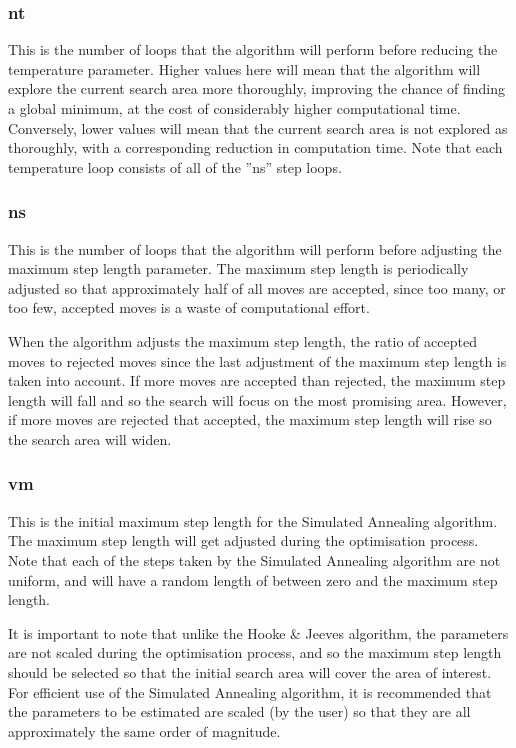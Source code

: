 \documentclass[10pt,twoside]{book}
\begin{document}
\subsubsection{nt}
This is the number of loops that the algorithm will perform before reducing the temperature parameter.  Higher values here will mean that the algorithm will explore the current search area more thoroughly, improving the chance of finding a global minimum, at the cost of considerably higher computational time.  Conversely, lower values will mean that the current search area is not explored as thoroughly, with a corresponding reduction in computation time.  Note that each temperature loop consists of all of the ''ns'' step loops.

\subsubsection{ns}
This is the number of loops that the algorithm will perform before adjusting the maximum step length parameter.  The maximum step length is periodically adjusted so that approximately half of all moves are accepted, since too many, or too few, accepted moves is a waste of computational effort.

\bigskip
When the algorithm adjusts the maximum step length, the ratio of accepted moves to rejected moves since the last adjustment of the maximum step length is taken into account.  If more moves are accepted than rejected, the maximum step length will fall and so the search will focus on the most promising area.  However, if more moves are rejected that accepted, the maximum step length will rise so the search area will widen.

\subsubsection{vm}
This is the initial maximum step length for the Simulated Annealing algorithm.  The maximum step length will get adjusted during the optimisation process.  Note that each of the steps taken by the Simulated Annealing algorithm are not uniform, and will have a random length of between zero and the maximum step length.

\bigskip
It is important to note that unlike the Hooke \& Jeeves algorithm, the parameters are not scaled during the optimisation process, and so the maximum step length should be selected so that the initial search area will cover the area of interest.  For efficient use of the Simulated Annealing algorithm, it is recommended that the parameters to be estimated are scaled (by the user) so that they are all approximately the same order of magnitude.
\end{document}
